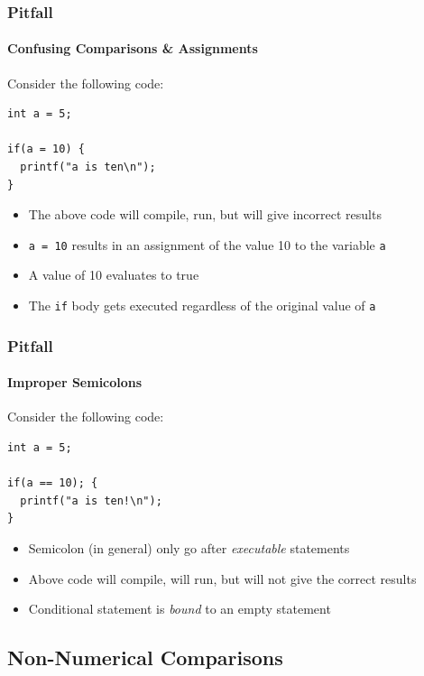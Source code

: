 \documentclass[]{beamer}
\begin{document}
\begin{frame}[fragile]
  \frametitle{Pitfall}
  \framesubtitle{Confusing Comparisons \& Assignments}

Consider the following code:

\begin{verbatim}
int a = 5;

if(a = 10) {
  printf("a is ten\n");
}
\end{verbatim}

\begin{itemize}[<+->]
  \item The above code will compile, run, but will give incorrect results
  \item \texttt{a = 10} results in an assignment of the value 10 to the variable \texttt{a}
  \item A value of 10 evaluates to true
  \item The \texttt{if} body gets executed regardless of the original value of 
  \texttt{a}
\end{itemize}

\end{frame}

\begin{frame}[fragile]
  \frametitle{Pitfall}
  \framesubtitle{Improper Semicolons}

Consider the following code:

\begin{verbatim}
int a = 5;

if(a == 10); {
  printf("a is ten!\n");
}
\end{verbatim}

\begin{itemize}[<+->]
  \item Semicolon (in general) only go after \emph{executable} statements
  \item Above code will compile, will run, but will not give the correct results
  \item Conditional statement is \emph{bound} to an empty statement
\end{itemize}

\end{frame}

\subsection{Non-Numerical Comparisons}
\end{document}
